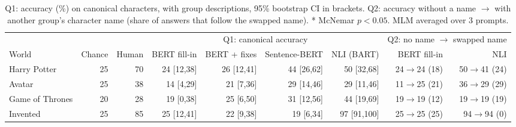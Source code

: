 \begin{table}[t]
\centering\footnotesize
\caption{Q1: accuracy (\%) on canonical characters, with group descriptions, 95\% bootstrap CI in brackets. Q2: accuracy without a name $\to$ with another group's character name (share of answers that follow the swapped name). * McNemar $p<0.05$. MLM averaged over 3 prompts.}
\label{tab:q1q2}
\begin{tabular}{lrrrrrrrr}
\toprule
 & & & \multicolumn{4}{c}{Q1: canonical accuracy} & \multicolumn{2}{c}{Q2: no name $\to$ swapped name} \\
\cmidrule(lr){4-7}\cmidrule(lr){8-9}
World & Chance & Human & BERT fill-in & BERT + fixes & Sentence-BERT & NLI (BART) & BERT fill-in & NLI \\
\midrule
Harry Potter & 25 & 70 & 24 {\tiny[12,38]} & 26 {\tiny[12,41]} & 44 {\tiny[26,62]} & 50 {\tiny[32,68]} & 24$\to$24 (18) & 50$\to$41 (24) \\
Avatar & 25 & 38 & 14 {\tiny[4,29]} & 21 {\tiny[7,36]} & 29 {\tiny[14,46]} & 29 {\tiny[11,46]} & 11$\to$25 (21) & 36$\to$29 (29) \\
Game of Thrones & 20 & 28 & 19 {\tiny[0,38]} & 25 {\tiny[6,50]} & 31 {\tiny[12,56]} & 44 {\tiny[19,69]} & 19$\to$19 (12) & 19$\to$19 (19) \\
Invented & 25 & 85 & 25 {\tiny[12,41]} & 22 {\tiny[9,38]} & 19 {\tiny[6,34]} & 97 {\tiny[91,100]} & 25$\to$25 (25) & 94$\to$94 (0) \\
\bottomrule
\end{tabular}
\end{table}
